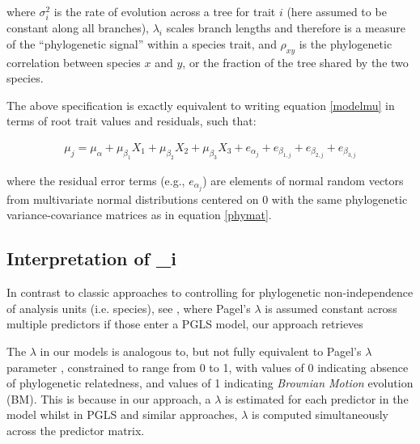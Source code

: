 \documentclass{article}\usepackage[]{graphicx}\usepackage[]{color}
\begin{document}
\noindent where $\sigma_i^2$ is the rate of evolution across a tree for trait $i$ (here assumed to be constant along all branches), $\lambda_i$ scales branch lengths and therefore is a measure of the ``phylogenetic signal'' within a species trait, and $\rho_{xy}$ is the phylogenetic correlation between species $x$ and $y$, or the fraction of the tree shared by the two species.

The above specification is exactly equivalent to writing equation \ref{modelmu} in terms of root trait values and residuals, such that:

\begin{align}
  \mu_j = \mu_\alpha + \mu_{\beta_1} X_1 + \mu_{\beta_2} X_2 + \mu_{\beta_3} X_3 + e_{\alpha_{j}} + e_{\beta_{1,j}} + e_{\beta_{2,j}} + e_{\beta_{3,j}}
\end{align}

\noindent where the residual error terms (e.g., $e_{\alpha_{j}}$) are elements of normal random vectors from multivariate normal distributions centered on $0$ with the same phylogenetic variance-covariance matrices as in equation \ref{phymat}.


\subsection*{Interpretation of \lambda_i}

\item In contrast to classic approaches to controlling for phylogenetic non-independence of analysis units (i.e. species), see \citep{freckleton2002phylogenetic}, where Pagel's \cite{pagel1999inferring} $\lambda$ is assumed constant across multiple predictors if those enter a PGLS model, our approach retrieves 

\item The $\lambda$ in our models is analogous to, but not fully equivalent to Pagel's \cite{pagel1999inferring} $\lambda$ parameter \citep{housworth2004phylogenetic}, constrained to range from 0 to 1, with values of 0 indicating absence of phylogenetic relatedness, and values of 1 indicating \emph{Brownian Motion} evolution (BM). This is because in our approach, a $\lambda$  is estimated for each predictor in the model whilst in PGLS and similar approaches, $\lambda$ is computed simultaneously across the predictor matrix. 


\end{document}

